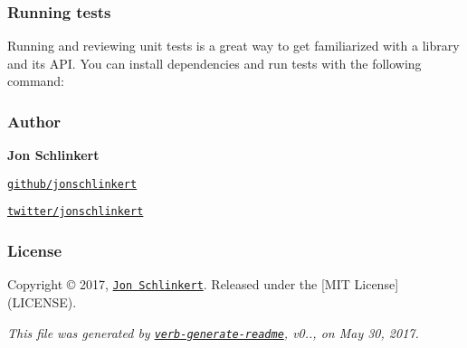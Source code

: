 \subsubsection*{Running tests}

Running and reviewing unit tests is a great way to get familiarized with a library and its A\+PI. You can install dependencies and run tests with the following command\+:




\subsubsection*{Author}

{\bfseries Jon Schlinkert}


\begin{DoxyItemize}
\item \href{https://github.com/jonschlinkert}{\tt github/jonschlinkert}
\item \href{https://twitter.com/jonschlinkert}{\tt twitter/jonschlinkert}
\end{DoxyItemize}

\subsubsection*{License}

Copyright © 2017, \href{https://github.com/jonschlinkert}{\tt Jon Schlinkert}. Released under the \mbox{[}M\+IT License\mbox{]}(L\+I\+C\+E\+N\+SE).





{\itshape This file was generated by \href{https://github.com/verbose/verb-generate-readme}{\tt verb-\/generate-\/readme}, v0.., on May 30, 2017.} 
